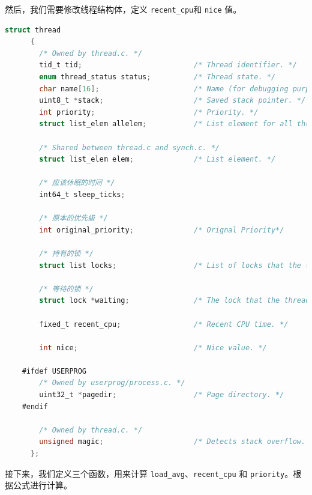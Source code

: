\documentclass{article}
\begin{document}
然后，我们需要修改线程结构体，定义 \texttt{recent\_cpu}和 \texttt{nice} 值。

\begin{lstlisting}[language=C, title=修改后的线程结构体]
      struct thread
      {
        /* Owned by thread.c. */
        tid_t tid;                          /* Thread identifier. */
        enum thread_status status;          /* Thread state. */
        char name[16];                      /* Name (for debugging purposes). */
        uint8_t *stack;                     /* Saved stack pointer. */
        int priority;                       /* Priority. */
        struct list_elem allelem;           /* List element for all threads list. */

        /* Shared between thread.c and synch.c. */
        struct list_elem elem;              /* List element. */

        /* 应该休眠的时间 */
        int64_t sleep_ticks;

        /* 原本的优先级 */
        int original_priority;              /* Orignal Priority*/

        /* 持有的锁 */
        struct list locks;                  /* List of locks that the thread is holding. */

        /* 等待的锁 */
        struct lock *waiting;               /* The lock that the thread is waiting for. */

        fixed_t recent_cpu;                 /* Recent CPU time. */

        int nice;                           /* Nice value. */

    #ifdef USERPROG
        /* Owned by userprog/process.c. */
        uint32_t *pagedir;                  /* Page directory. */
    #endif

        /* Owned by thread.c. */
        unsigned magic;                     /* Detects stack overflow. */
      };
\end{lstlisting}

接下来，我们定义三个函数，用来计算 \texttt{load\_avg}、\texttt{recent\_cpu} 和 \texttt{priority}。根据公式进行计算。
\end{document}
